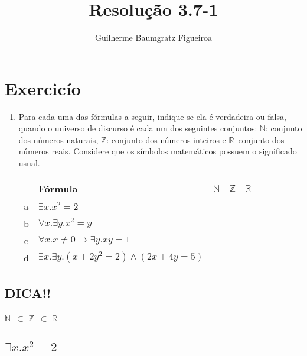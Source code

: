 \documentclass[aspectratio=43]{beamer}
\title[\sc{Resolu\c c\~ao}]{Resolu\c c\~ao 3.7-1}
\author[Guilherme Baumgratz Figueiroa]{Guilherme Baumgratz Figueiroa}
\institute[UFOP]{Universidade Federal de Ouro Preto} %
\date{}
\newcommand{\nat}{$\mathbb{N}$}
\newcommand{\inteiro}{$\mathbb{Z}$}
\newcommand{\real}{$\mathbb{R}$}
\begin{document}
	
	\begin{frame}
		\titlepage
	\end{frame}

	\section{Exercic\'io}

	\begin{frame}[fragile]
    \begin{enumerate}[1.]

		\item Para cada uma das f\'ormulas a seguir, indique se ela \'e verdadeira ou falsa, quando o universo de discurso é cada um dos seguintes conjuntos: \nat : conjunto dos n\'umeros naturais, \inteiro : conjunto dos n\'umeros inteiros e \real\ conjunto dos n\'umeros reais. Considere que os símbolos matemáticos possuem o significado usual.\\
        \centering
        \vspace{20pt}
        \begin{tabular}{c|l|c|c|c|}

        	\ & F\'ormula & \nat & \inteiro & \real \\\hline
        	a & $\exists x.x^{2} = 2$ & \ & \ & \  \\
        	b & $\forall x. \exists y. x^{2} = y$ & \ & \ & \  \\
        	c & $\forall x. x \neq 0 \to \exists y.xy = 1 $ & \ & \ & \  \\
        	d & $\exists x. \exists y.(x + 2y^{2} = 2) \land (2x + 4y = 5)$ & \ & \ & \  \\
		\end{tabular}
        
	\end{enumerate}
		
	\end{frame}
    
    \subsection{DICA!!}
	
   	\begin{frame}[fragile]
    
    \centering
    \huge \nat\ $\subset$ \inteiro\ $\subset$ \real

	\end{frame}


    \subsection{$\exists x.x^{2} = 2$}
    
\end{document}

